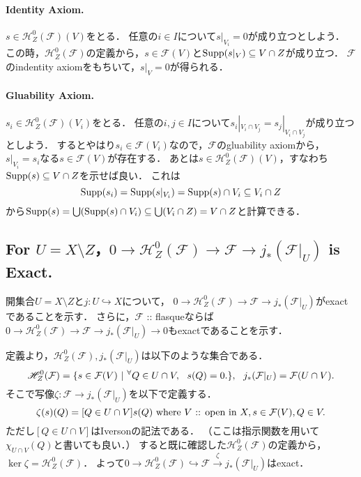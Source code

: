 \documentclass[a4paper]{jsarticle}
\newcommand{\shF}{\mathcal{F}}
\newcommand{\OpenIn}{\text{ :: open in }}
\begin{document}
    \paragraph{Identity Axiom.}
    $s \in \mathscr{H}_Z^0(\shF)(V)$をとる．
    任意の$i \in I$について$s|_{V_i}=0$が成り立つとしよう．
    この時，$\mathscr{H}_Z^0(\shF)$の定義から，$s \in \shF(V)$と$\operatorname{Supp} (s|_V) \subseteq V \cap Z$が成り立つ．
    $\shF$のindentity axiomをもちいて，$s|_V=0$が得られる．

    \paragraph{Gluability Axiom.}
    $s_i \in \mathscr{H}_Z^0(\shF)(V_i)$をとる．
    任意の$i,j \in I$について$s_i|_{V_i \cap V_j}=s_j|_{V_i \cap V_j}$が成り立つとしよう．
    するとやはり$s_i \in \shF(V_i)$なので，$\shF$のgluability axiomから，
    $s|_{V_i}=s_i$なる$s \in \shF(V)$が存在する．
    あとは$s \in \mathscr{H}_Z^0(\shF)(V)$，すなわち$\operatorname{Supp}(s) \subseteq V \cap Z$を示せば良い．
    これは
    \[ \operatorname{Supp}(s_i)=\operatorname{Supp}(s|_{V_i})=\operatorname{Supp}(s) \cap V_i \subseteq V_i \cap Z\]
    から$\operatorname{Supp}(s)=\bigcup (\operatorname{Supp}(s) \cap V_i) \subseteq \bigcup (V_i \cap Z)=V \cap Z$と計算できる．

    \subsection{For $U=X \setminus Z$，$0 \to \mathscr{H}_Z^0(\shF) \to \shF \to j_*(\shF|_U)$ is Exact.}
    開集合$U=X \setminus Z$と$j: U \hookrightarrow X$について，
    $0 \to \mathscr{H}_Z^0(\shF) \to \shF \to j_*(\shF|_U)$がexactであることを示す．
    さらに，$\shF$ :: flasqueならば$0 \to \mathscr{H}_Z^0(\shF) \to \shF \to j_*(\shF|_U) \to 0$もexactであることを示す．

    定義より，$\mathscr{H}_Z^0(\shF), j_*(\shF|_U)$は以下のような集合である．
    \[
        \mathscr{H}_Z^0(\shF)=\{ s \in \shF(V) ~|~ \Forall{Q \in U \cap V} s(Q)=0. \},~~
        j_*(\shF|_U)=\shF(U \cap V).
    \]
    そこで写像$\zeta: \shF \to j_*(\shF|_U)$を以下で定義する．
    \[ \zeta(s)(Q)=[Q \in U \cap V]s(Q) \mwhere V \OpenIn X, s \in \shF(V), Q \in V. \]
    ただし$[Q \in U \cap V]$はIversonの記法である．
    （ここは指示関数を用いて$\chi_{U \cap V}(Q)$と書いても良い．）
    すると既に確認した$\mathscr{H}_Z^0(\shF)$の定義から，$\ker \zeta=\mathscr{H}_Z^0(\shF)$．
    よって$0 \to \mathscr{H}_Z^0(\shF) \hookrightarrow \shF \xrightarrow{\zeta} j_*(\shF|_U)$はexact．
    
\end{document}
